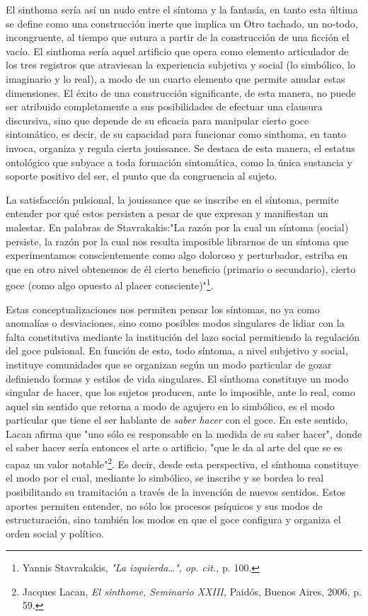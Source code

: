 \documentclass{book}
\begin{document}
El sinthoma sería así un nudo entre el síntoma y la fantasía, en tanto
esta última se define como una construcción inerte que implica un Otro
tachado, un no-todo, incongruente, al tiempo que sutura a partir de la
construcción de una ficción el vacío. El sinthoma sería aquel artificio
que opera como elemento articulador de los tres registros que atraviesan
la experiencia subjetiva y social (lo simbólico, lo imaginario y lo
real), a modo de un cuarto elemento que permite anudar estas
dimensiones. El éxito de una construcción significante, de esta manera,
no puede ser atribuido completamente a sus posibilidades de efectuar una
clausura discursiva, sino que depende de su eficacia para manipular
cierto goce sintomático, es decir, de su capacidad para funcionar como
sinthoma, en tanto invoca, organiza y regula cierta jouissance. Se
destaca de esta manera, el estatus ontológico que subyace a toda
formación sintomática, como la única sustancia y soporte positivo del
ser, el punto que da congruencia al sujeto.

La satisfacción pulsional, la jouissance que se inscribe en el síntoma,
permite entender por qué estos persisten a pesar de que expresan y
manifiestan un malestar. En palabras de Stavrakakis:"La razón por la
cual un síntoma (social) persiste, la razón por la cual nos resulta
imposible librarnos de un síntoma que experimentamos conscientemente
como algo doloroso y perturbador, estriba en que en otro nivel obtenemos
de él cierto beneficio (primario o secundario), cierto goce (como algo
opuesto al placer consciente)"\footnote{Yannis Stavrakakis, \emph{"La
  izquierda\ldots", op. cit.,} p. 100.}.

Estas conceptualizaciones nos permiten pensar los síntomas, no ya como
anomalías o desviaciones, sino como posibles modos singulares de lidiar
con la falta constitutiva mediante la institución del lazo social
permitiendo la regulación del goce pulsional. En función de esto, todo
síntoma, a nivel subjetivo y social, instituye comunidades que se
organizan según un modo particular de gozar definiendo formas y estilos
de vida singulares. El sínthoma constituye un modo singular de hacer,
que los sujetos producen, ante lo imposible, ante lo real, como aquel
sin sentido que retorna a modo de agujero en lo simbólico, es el modo
particular que tiene el ser hablante de \emph{saber hacer} con el goce.
En este sentido, Lacan afirma que "uno sólo es responsable en la medida
de su saber hacer", donde el saber hacer sería entonces el arte o
artificio, "que le da al arte del que se es capaz un valor
notable"\footnote{Jacques Lacan, \emph{El sinthome, Seminario XXIII,}
  Paidós, Buenos Aires, 2006, p. 59.}. Es decir, desde esta perspectiva,
el sínthoma constituye el modo por el cual, mediante lo simbólico, se
inscribe y se bordea lo real posibilitando su tramitación a través de la
invención de nuevos sentidos. Estos aportes permiten entender, no sólo
los procesos psíquicos y sus modos de estructuración, sino también los
modos en que el goce configura y organiza el orden social y político.
\end{document}
